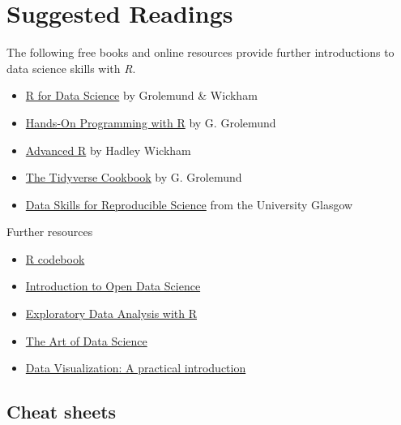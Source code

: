 \documentclass[
]{scrartcl}
\providecommand{\tightlist}{%
  \setlength{\itemsep}{0pt}\setlength{\parskip}{0pt}}
\begin{document}
\hypertarget{readings}{%
\section{Suggested Readings}\label{readings}}

The following free books and online resources provide further introductions to data science skills with \emph{R}.

\begin{itemize}
\tightlist
\item
  \href{https://r4ds.had.co.nz/}{R for Data Science} by Grolemund \& Wickham
\item
  \href{https://rstudio-education.github.io/hopr/}{Hands-On Programming with R} by G. Grolemund
\item
  \href{https://adv-r.hadley.nz/}{Advanced R} by Hadley Wickham
\item
  \href{https://rstudio-education.github.io/tidyverse-cookbook}{The Tidyverse Cookbook} by G. Grolemund
\item
  \href{https://psyteachr.github.io/reprores-v3/index.html}{Data Skills for Reproducible Science} from the University Glasgow
\end{itemize}

Further resources

\begin{itemize}
\tightlist
\item
  \href{http://www.cookbook-r.com/}{R codebook}
\item
  \href{http://ohi-science.org/data-science-training/}{Introduction to Open Data Science}
\item
  \href{https://bookdown.org/rdpeng/exdata/}{Exploratory Data Analysis with R}
\item
  \href{https://bookdown.org/rdpeng/artofdatascience/}{The Art of Data Science}
\item
  \href{http://socviz.co/}{Data Visualization: A practical introduction}
\end{itemize}

\hypertarget{cheatsheets}{%
\subsection{Cheat sheets}\label{cheatsheets}}
\end{document}
